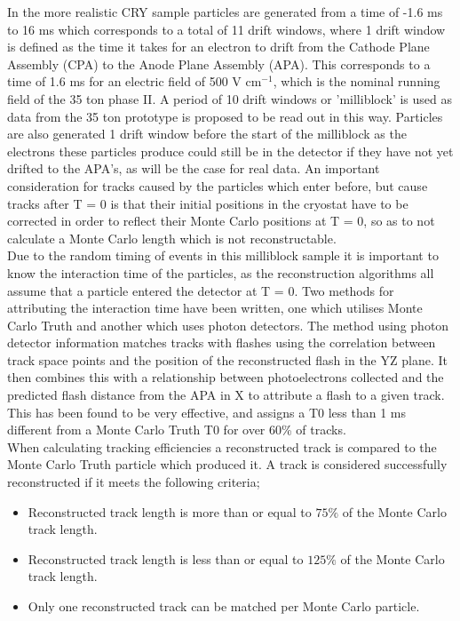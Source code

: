 \documentclass[11pt]{report} %
\begin{document}
{In the more realistic CRY sample particles are generated from a time of -1.6 ms to 16 ms which corresponds to a total of 11 drift windows, where 1 drift window is defined as the time it takes for an electron to drift from the Cathode Plane Assembly (CPA) to the Anode Plane Assembly (APA). This corresponds to a time of 1.6 ms for an electric field of 500 V cm\(^{-1}\), which is the nominal running field of the 35 ton phase II. A period of 10 drift windows or 'milliblock' is used as data from the 35 ton prototype is proposed to be read out in this way. Particles are also generated 1 drift window before the start of the milliblock as the electrons these particles produce could still be in the detector if they have not yet drifted to the APA's, as will be the case for real data. An important consideration for tracks caused by the particles which enter before, but cause tracks after T = 0 is that their initial positions in the cryostat have to be corrected in order to reflect their Monte Carlo positions at T = 0, so as to not calculate a Monte Carlo length which is not reconstructable. \\

Due to the random timing of events in this milliblock sample it is important to know the interaction time of the particles, as the reconstruction algorithms all assume that a particle entered the detector at T = 0. Two methods for attributing the interaction time have been written, one which utilises Monte Carlo Truth and another which uses photon detectors. The method using photon detector information matches tracks with flashes using the correlation between track space points and the position of the reconstructed flash in the YZ plane. It then combines this with a relationship between photoelectrons collected and the predicted flash distance from the APA in X to attribute a flash to a given track. This has been found to be very effective, and assigns a T0 less than 1 ms different from a Monte Carlo Truth T0 for over 60\% of tracks. \\

When calculating tracking efficiencies a reconstructed track is compared to the Monte Carlo Truth particle which produced it. A track is considered successfully reconstructed if it meets the following criteria;
\begin{itemize}
\item Reconstructed track length is more than or equal to \( 75\% \) of the Monte Carlo track length.
\item Reconstructed track length is less than or equal to \( 125\% \) of the Monte Carlo track length.
\item Only one reconstructed track can be matched per Monte Carlo particle.
\end{itemize}

}
\end{document}
